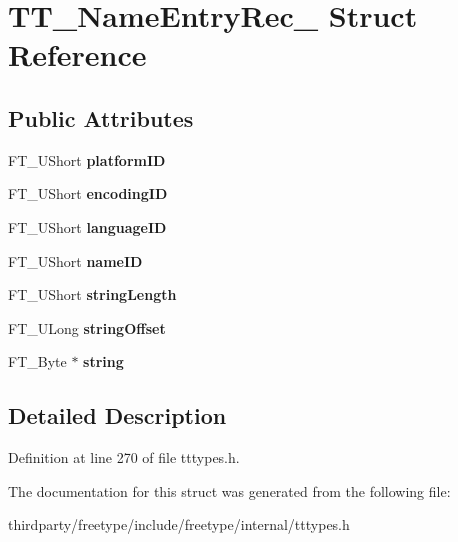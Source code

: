 \hypertarget{struct_t_t___name_entry_rec__}{}\section{T\+T\+\_\+\+Name\+Entry\+Rec\+\_\+ Struct Reference}
\label{struct_t_t___name_entry_rec__}
\subsection*{Public Attributes}
\begin{DoxyCompactItemize}
\item 
\mbox{\label{struct_t_t___name_entry_rec___a9d4ee8bc42ed087f4533b6f664c0f6c6}} 
F\+T\+\_\+\+U\+Short {\bfseries platform\+ID}
\item 
\mbox{\label{struct_t_t___name_entry_rec___a8e7403a2f37c7f7fdb3c19e9549d315c}} 
F\+T\+\_\+\+U\+Short {\bfseries encoding\+ID}
\item 
\mbox{\label{struct_t_t___name_entry_rec___a2ec03c0ff0c542f403b45a515bb20afb}} 
F\+T\+\_\+\+U\+Short {\bfseries language\+ID}
\item 
\mbox{\label{struct_t_t___name_entry_rec___abdaaec01d6620b3801f233cde5964548}} 
F\+T\+\_\+\+U\+Short {\bfseries name\+ID}
\item 
\mbox{\label{struct_t_t___name_entry_rec___a736e5f8caeada86cc33f62acca6537f5}} 
F\+T\+\_\+\+U\+Short {\bfseries string\+Length}
\item 
\mbox{\label{struct_t_t___name_entry_rec___a33ed41d4d3c4fffa74193f3b52e11870}} 
F\+T\+\_\+\+U\+Long {\bfseries string\+Offset}
\item 
\mbox{\label{struct_t_t___name_entry_rec___aefa752d5c88149f8e64122e14855d831}} 
F\+T\+\_\+\+Byte $\ast$ {\bfseries string}
\end{DoxyCompactItemize}


\subsection{Detailed Description}


Definition at line 270 of file tttypes.\+h.



The documentation for this struct was generated from the following file\+:\begin{DoxyCompactItemize}
\item 
thirdparty/freetype/include/freetype/internal/tttypes.\+h\end{DoxyCompactItemize}

